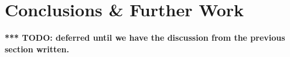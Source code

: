 \chapter{Conclusions \& Further Work}\label{ch:5}

{\bf \color{red} *** TODO: deferred until we have the discussion from the previous section written.}

